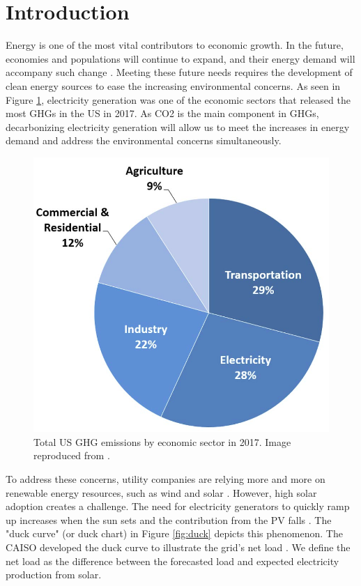 
\section{Introduction}

Energy is one of the most vital contributors to economic growth.
In the future, economies and populations will continue to expand, and their energy demand will accompany such change \cite{burke_impact_2018} \cite{el-shafie_hydrogen_2019}.
Meeting these future needs requires the development of clean energy sources to ease the increasing environmental concerns.
As seen in Figure \ref{fig:ghg}, electricity generation was one of the economic sectors that released the most \glspl{GHG} in the \gls{US} in 2017.
As \gls{CO2} is the main component in \glspl{GHG}, decarbonizing electricity generation will allow us to meet the increases in energy demand and address the environmental concerns simultaneously.

\begin{figure}[htbp!]
	\centering
	\includegraphics[width=0.4\linewidth]{figures-hydro/total-ghg-2017.png}
	\hfill
	\caption{Total US GHG emissions by economic sector in 2017. Image reproduced from \cite{us_epa_sources_2020}.}
	\label{fig:ghg}
\end{figure}

To address these concerns, utility companies are relying more and more on renewable energy resources, such as wind and solar \cite{ming_resource_2019}.
However, high solar adoption creates a challenge.
The need for electricity generators to quickly ramp up increases when the sun sets and the contribution from the \gls{PV} falls \cite{us_department_of_energy_confronting_2017}.
The "duck curve" (or duck chart) in Figure \ref{fig:duck} depicts this phenomenon.
The \gls{CAISO} developed the duck curve to illustrate the grid's net load \cite{bouillon_prepared_2014}.
We define the net load as the difference between the forecasted load and expected electricity production from solar.

